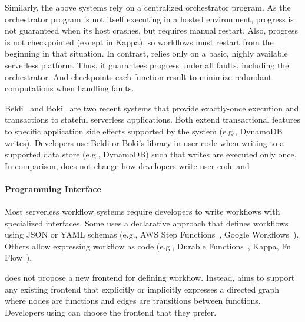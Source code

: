 Similarly, the above systems rely on a centralized orchestrator program. As
the orchestrator program is not itself executing in a hosted environment,
progress is not guaranteed when its host crashes, but requires manual restart.
Also, progress is not checkpointed (except in Kappa), so workflows must
restart from the beginning in that situation. In contrast, \name{} relies only
on a basic, highly available serverless platform. Thus, it guarantees progress
under all faults, including the orchestrator. And \name{} checkpoints each
function result to minimize redundant computations when handling faults.

Beldi~\cite{beldi} and Boki~\cite{boki} are two recent systems that provide
exactly-once execution and transactions to stateful serverless applications.
Both extend transactional features to specific application side effects
supported by the system (e.g., DynamoDB writes). Developers use Beldi or
Boki's library in user code when writing to a supported data store (e.g.,
DynamoDB) such that writes are executed only once. In comparison, \name{} does
not change how developers write user code and 

\paragraph{Programming Interface}

Most serverless workflow systems require developers to write workflows with
specialized interfaces. Some uses a declarative approach that defines
workflows using JSON or YAML schemas (e.g., AWS Step
Functions~\cite{aws-step-functions}, Google
Workflows~\cite{google-workflows}). Others allow expressing workflow as code
(e.g., Durable Functions~\cite{durable-functions}, Kappa\cite{kappa}, Fn
Flow~\cite{fn-flow}).

\name{} does not propose a new frontend for defining workflow. Instead,
\name{} aims to support any existing frontend that explicitly or implicitly
expresses a directed graph where nodes are functions and edges are transitions
between functions. Developers using \name{} can choose the frontend that they
prefer.



